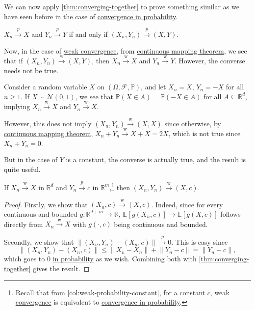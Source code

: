 We can now apply \autoref{thm:converging-together} to prove something similar as we have seen before in the case of \hyperref[def:converge-in-probability]{convergence in probability}.

\begin{prev}
	\(X_n \overset{p}{\to } X\) and \(Y_n \overset{p}{\to } Y\) if and only if \((X_n , Y_n) \overset{p}{\to } (X, Y)\).
\end{prev}

Now, in the case of \hyperref[def:converge-weakly]{weak convergence}, from \hyperref[thm:continuous-mapping]{continuous mapping theorem}, we see that if \((X_n , Y_n) \overset{\text{w} }{\to } (X, Y)\), then \(X_n \overset{\text{w} }{\to } X\) and \(Y_n \overset{\text{w} }{\to } Y\). However, the converse needs not be true.

\begin{eg}\label{eg:counter-example-continuous-mapping}
	Consider a random variable \(X\) on \((\Omega , \mathscr{F} , \mathbb{P} )\), and let \(X_n = X\), \(Y_n = -X\) for all \(n \geq 1\). If \(X \sim \mathcal{N} (0, 1)\), we see that \(\mathbb{P} (X \in A) = \mathbb{P} (-X \in A)\) for all \(A \subseteq \mathbb{R} ^d\), implying \(X_n \overset{\text{w} }{\to } X\) and \(Y_n \overset{\text{w} }{\to } X\).

	However, this does not imply \((X_n , Y_n) \overset{\text{w} }{\to } (X, X)\) since otherwise, by \hyperref[thm:continuous-mapping]{continuous mapping theorem}, \(X_n + Y_n \overset{\text{w} }{\to } X + X = 2X\), which is not true since \(X_n + Y_n = 0\).
\end{eg}

But in the case of \(Y\) is a constant, the converse is actually true, and the result is quite useful.

\begin{theorem}\label{thm:Slutsky}
	If \(X_n \overset{\text{w} }{\to } X \) in \(\mathbb{R} ^d\) and \(Y_n \overset{p}{\to } c\) in \(\mathbb{R} ^m\),\footnote{Recall that from \autoref{col:weak-probability-constant}, for a constant \(c\), \hyperref[def:converge-weakly]{weak convergence} is equivalent to \hyperref[def:converge-in-probability]{convergence in probability}.} then \((X_n , Y_n) \overset{\text{w} }{\to } (X, c)\).
\end{theorem}
\begin{proof}
	Firstly, we show that \((X_n , c) \overset{\text{w} }{\to } (X, c)\). Indeed, since for every continuous and bounded \(g \colon \mathbb{R} ^{d+m} \to \mathbb{R} \), \(\mathbb{E}_{}\left[g(X_n, c) \right] \to \mathbb{E}_{}\left[g(X, c) \right]\) follows directly from \(X_n \overset{\text{w} }{\to } X\) with \(g(\cdot, c)\) being continuous and bounded.

	Secondly, we show that \(\lVert (X_n, Y_n) - (X_n, c) \rVert \overset{p}{\to } 0\). This is easy since
	\[
		\lVert (X_n, Y_n) - (X_n, c) \rVert
		\leq \lVert X_n - X_n \rVert + \lVert Y_n - c \rVert
		= \lVert Y_n - c \rVert ,
	\]
	which goes to \(0\) \hyperref[def:converge-in-probability]{in probability} as we wish. Combining both with \autoref{thm:converging-together} gives the result.
\end{proof}

